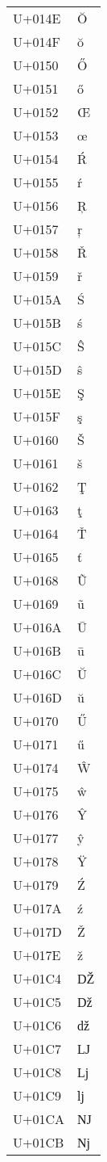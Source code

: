 \documentclass{article}
\begin{document}
\begin{longtable}{ll}
U+014E & Ŏ \\
U+014F & ŏ \\
U+0150 & Ő \\
U+0151 & ő \\
U+0152 & Œ \\
U+0153 & œ \\
U+0154 & Ŕ \\
U+0155 & ŕ \\
U+0156 & Ŗ \\
U+0157 & ŗ \\
U+0158 & Ř \\
U+0159 & ř \\
U+015A & Ś \\
U+015B & ś \\
U+015C & Ŝ \\
U+015D & ŝ \\
U+015E & Ş \\
U+015F & ş \\
U+0160 & Š \\
U+0161 & š \\
U+0162 & Ţ \\
U+0163 & ţ \\
U+0164 & Ť \\
U+0165 & ť \\
U+0168 & Ũ \\
U+0169 & ũ \\
U+016A & Ū \\
U+016B & ū \\
U+016C & Ŭ \\
U+016D & ŭ \\
U+0170 & Ű \\
U+0171 & ű \\
U+0174 & Ŵ \\
U+0175 & ŵ \\
U+0176 & Ŷ \\
U+0177 & ŷ \\
U+0178 & Ÿ \\
U+0179 & Ź \\
U+017A & ź \\
U+017D & Ž \\
U+017E & ž \\
U+01C4 & Ǆ \\
U+01C5 & ǅ \\
U+01C6 & ǆ \\
U+01C7 & Ǉ \\
U+01C8 & ǈ \\
U+01C9 & ǉ \\
U+01CA & Ǌ \\
U+01CB & ǋ \\

\end{longtable}
\end{document}
